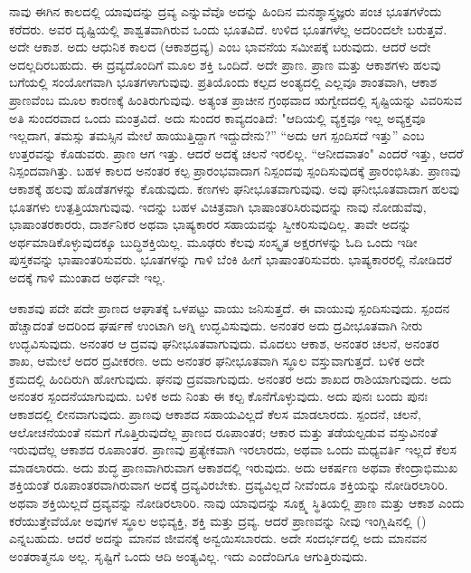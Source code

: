ನಾವು ಈಗಿನ ಕಾಲದಲ್ಲಿ ಯಾವುದನ್ನು ದ್ರವ್ಯ ಎನ್ನುವೆವೊ ಅದನ್ನು ಹಿಂದಿನ ಮನಶ್ಶಾಸ್ತ್ರಜ್ಞರು ಪಂಚ ಭೂತಗಳೆಂದು ಕರೆದರು. ಅವರ ದೃಷ್ಟಿಯಲ್ಲಿ ಶಾಶ್ವತವಾಗಿರುವ ಒಂದು ಭೂತವಿದೆ. ಉಳಿದ ಭೂತಗಳೆಲ್ಲ ಅದರಿಂದಲೇ ಬರುತ್ತವೆ. ಅದೇ ಆಕಾಶ. ಅದು ಆಧುನಿಕ ಕಾಲದ  (ಆಕಾಶದ್ರವ್ಯ) ಎಂಬ ಭಾವನೆಯ ಸಮೀಪಕ್ಕೆ ಬರುವುದು. ಆದರೆ ಅದೇ ಅದಲ್ಲದಿರಬಹುದು. ಈ ದ್ರವ್ಯದೊಂದಿಗೆ ಮೂಲ ಶಕ್ತಿ ಒಂದಿದೆ. ಅದೇ ಪ್ರಾಣ. ಪ್ರಾಣ ಮತ್ತು ಆಕಾಶಗಳು ಹಲವು ಬಗೆಯಲ್ಲಿ ಸಂಯೋಗವಾಗಿ ಭೂತಗಳಾಗುವುವು. ಪ್ರತಿಯೊಂದು ಕಲ್ಪದ ಅಂತ್ಯದಲ್ಲಿ ಎಲ್ಲವೂ ಶಾಂತವಾಗಿ, ಆಕಾಶ ಪ್ರಾಣವೆಂಬ ಮೂಲ ಕಾರಣಕ್ಕೆ ಹಿಂತಿರುಗುವುವು. ಅತ್ಯಂತ ಪ್ರಾಚೀನ ಗ್ರಂಥವಾದ ಋಗ್ವೇದದಲ್ಲಿ ಸೃಷ್ಟಿಯನ್ನು ವಿವರಿಸುವ ಅತಿ ಸುಂದರವಾದ ಒಂದು ಮಂತ್ರವಿದೆ. ಅದು ಸುಂದರ ಕಾವ್ಯದಂತಿದೆ: "ಆದಿಯಲ್ಲಿ ವ್ಯಕ್ತವೂ ಇಲ್ಲ ಅವ್ಯಕ್ತವೂ ಇಲ್ಲದಾಗ, ತಮಸ್ಸು ತಮಸ್ಸಿನ ಮೇಲೆ ಹಾಯುತ್ತಿದ್ದಾಗ ಇದ್ದುದೇನು?” “ಅದು ಆಗ ಸ್ಪಂದಿಸದೆ ಇತ್ತು” ಎಂಬ ಉತ್ತರವನ್ನು ಕೊಡುವರು. ಪ್ರಾಣ ಆಗ ಇತ್ತು. ಆದರೆ ಅದಕ್ಕೆ ಚಲನೆ ಇರಲಿಲ್ಲ. “ಆನೀದವಾತಂ" ಎಂದರೆ ಇತ್ತು, ಆದರೆ ನಿಸ್ಪಂದವಾಗಿತ್ತು. ಬಹಳ ಕಾಲದ ಅನಂತರ ಕಲ್ಪ ಪ್ರಾರಂಭವಾದಾಗ ನಿಸ್ಪಂದವು ಸ್ಪಂದಿಸುವುದಕ್ಕೆ ಪ್ರಾರಂಭಿಸಿತು. ಪ್ರಾಣವು ಆಕಾಶಕ್ಕೆ ಹಲವು ಹೊಡೆತಗಳನ್ನು ಕೊಡುವುದು. ಕಣಗಳು ಘನೀಭೂತವಾಗುವುವು. ಅವು ಘನೀಭೂತವಾದಾಗ ಹಲವು ಭೂತಗಳು ಉತ್ಪತ್ತಿಯಾಗುವುವು. ಇದನ್ನು ಬಹಳ ವಿಚಿತ್ರವಾಗಿ ಭಾಷಾಂತರಿಸಿರುವುದನ್ನು ನಾವು ನೋಡುವೆವು, ಭಾಷಾಂತರಕಾರರು, ದಾರ್ಶನಿಕರ ಅಥವಾ ಭಾಷ್ಯಕಾರರ ಸಹಾಯವನ್ನು ಸ್ವೀಕರಿಸುವುದಿಲ್ಲ. ತಾವೇ ಅದನ್ನು ಅರ್ಥಮಾಡಿಕೊಳ್ಳುವುದಕ್ಕೂ ಬುದ್ಧಿಶಕ್ತಿಯಿಲ್ಲ. ಮೂಢರು ಕೆಲವು ಸಂಸ್ಕೃತ ಅಕ್ಷರಗಳನ್ನು ಓದಿ ಒಂದು ಇಡೀ ಪುಸ್ತಕವನ್ನು ಭಾಷಾಂತರಿಸುವರು. ಭೂತಗಳನ್ನು ಗಾಳಿ ಬೆಂಕಿ ಹೀಗೆ ಭಾಷಾಂತರಿಸುವರು. ಭಾಷ್ಯಕಾರರಲ್ಲಿ ನೋಡಿದರೆ ಅದಕ್ಕೆ ಗಾಳಿ ಮುಂತಾದ ಅರ್ಥವೇ ಇಲ್ಲ.

ಆಕಾಶವು ಪದೇ ಪದೇ ಪ್ರಾಣದ ಆಘಾತಕ್ಕೆ ಒಳಪಟ್ಟು ವಾಯು ಜನಿಸುತ್ತದೆ. ಈ ವಾಯುವು ಸ್ಪಂದಿಸುವುದು. ಸ್ಪಂದನ ಹೆಚ್ಚಾದಂತೆ ಅದರಿಂದ ಘರ್ಷಣೆ ಉಂಟಾಗಿ ಅಗ್ನಿ ಉದ್ಭವಿಸುವುದು. ಅನಂತರ ಅದು ದ್ರವೀಭೂತವಾಗಿ ನೀರು ಉದ್ಭವಿಸುವುದು. ಅನಂತರ ಆ ದ್ರವವು ಘನೀಭೂತವಾಗುವುದು. ಮೊದಲು ಆಕಾಶ, ಅನಂತರ ಚಲನೆ, ಅನಂತರ ಶಾಖ, ಆಮೇಲೆ ಅದರ ದ್ರವೀಕರಣ. ಅದು ಅನಂತರ ಘನೀಭೂತವಾಗಿ ಸ್ಥೂಲ ವಸ್ತುವಾಗುತ್ತದೆ. ಬಳಿಕ ಅದೇ ಕ್ರಮದಲ್ಲಿ ಹಿಂದಿರುಗಿ ಹೋಗುವುದು. ಘನವು ದ್ರವವಾಗುವುದು. ಅನಂತರ ಅದು ಶಾಖದ ರಾಶಿಯಾಗುವುದು. ಅದು ಅನಂತರ ಸ್ಪಂದನೆಯಾಗುವುದು. ಬಳಿಕ ಅದು ನಿಂತು ಈ ಕಲ್ಪ ಕೊನೆಗೊಳ್ಳುವುದು. ಅದು ಪುನಃ ಬಂದು ಪುನಃ ಆಕಾಶದಲ್ಲಿ ಲೀನವಾಗುವುದು. ಪ್ರಾಣವು ಆಕಾಶದ ಸಹಾಯವಿಲ್ಲದೆ ಕೆಲಸ ಮಾಡಲಾರದು. ಸ್ಪಂದನೆ, ಚಲನೆ, ಆಲೋಚನೆಯಂತೆ ನಮಗೆ ಗೊತ್ತಿರುವುದೆಲ್ಲ ಪ್ರಾಣದ ರೂಪಾಂತರ; ಆಕಾರ ಮತ್ತು ತಡೆಯಲ್ಪಡುವ ವಸ್ತುವಿನಂತೆ ಇರುವುದೆಲ್ಲ ಆಕಾಶದ ರೂಪಾಂತರ. ಪ್ರಾಣವು ಪ್ರತ್ಯೇಕವಾಗಿ ಇರಲಾರದು, ಅಥವಾ ಒಂದು ಮಧ್ಯವರ್ತಿ ಇಲ್ಲದೆ ಕೆಲಸ ಮಾಡಲಾರದು. ಅದು ಶುದ್ಧ ಪ್ರಾಣವಾಗಿರುವಾಗ ಆಕಾಶದಲ್ಲಿ ಇರುವುದು. ಅದು ಆಕರ್ಷಣ ಅಥವಾ ಕೇಂದ್ರಾಭಿಮುಖ ಶಕ್ತಿಯಂತೆ ರೂಪಾಂತರವಾಗಿರುವಾಗ ಅದಕ್ಕೆ ದ್ರವ್ಯವಿರಬೇಕು. ದ್ರವ್ಯವಿಲ್ಲದೆ ನೀವೆಂದೂ ಶಕ್ತಿಯನ್ನು ನೋಡಿರಲಾರಿರಿ. ಅಥವಾ ಶಕ್ತಿಯಿಲ್ಲದೆ ದ್ರವ್ಯವನ್ನು ನೋಡಿರಲಾರಿರಿ. ನಾವು ಯಾವುದನ್ನು ಸೂಕ್ಷ್ಮ ಸ್ಥಿತಿಯಲ್ಲಿ ಪ್ರಾಣ ಮತ್ತು ಆಕಾಶ ಎಂದು ಕರೆಯುತ್ತೇವೆಯೋ ಅವುಗಳ ಸ್ಥೂಲ ಅಭಿವ್ಯಕ್ತಿ, ಶಕ್ತಿ ಮತ್ತು ದ್ರವ್ಯ. ಆದರೆ ಪ್ರಾಣವನ್ನು ನೀವು ಇಂಗ್ಲಿಷಿನಲ್ಲಿ () ಎನ್ನಬಹುದು. ಆದರೆ ಅದನ್ನು ಮಾನವ ಜೀವನಕ್ಕೆ ಅನ್ವಯಿಸಬಾರದು. ಅದೇ ಸಂದರ್ಭದಲ್ಲಿ ಅದು ಮಾನವನ ಅಂತರಾತ್ಮನೂ ಅಲ್ಲ. ಸೃಷ್ಟಿಗೆ ಒಂದು ಆದಿ ಅಂತ್ಯವಿಲ್ಲ. ಇದು ಎಂದೆಂದಿಗೂ ಆಗುತ್ತಿರುವುದು.

